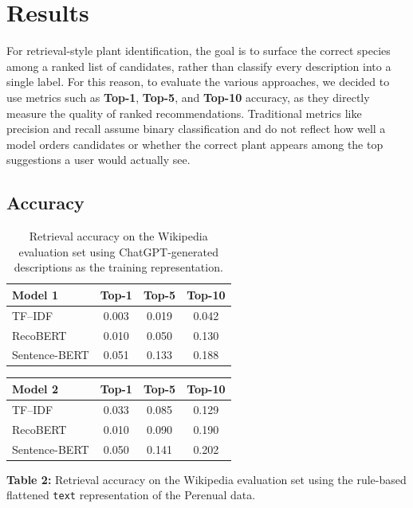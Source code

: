 \documentclass[11pt]{article}
\begin{document}
\section{Results}
For retrieval-style plant identification, the goal is to surface the correct species among a ranked list of candidates, rather than classify every description into a single label. For this reason, to evaluate the various approaches, we decided to use metrics such as \textbf{Top-1}, \textbf{Top-5}, and \textbf{Top-10} accuracy, as they directly measure the quality of ranked recommendations. Traditional metrics like precision and recall assume binary classification and do not reflect how well a model orders candidates or whether the correct plant appears among the top suggestions a user would actually see.

\subsection{Accuracy}
\begin{table}[!h]
\centering
\begin{tabular}{lccc}
\hline
\textbf{Model 1} & \textbf{Top-1} & \textbf{Top-5} & \textbf{Top-10} \\
\hline
TF--IDF         & 0.003 & 0.019 & 0.042 \\
RecoBERT        & 0.010 & 0.050 & 0.130 \\
Sentence-BERT   & 0.051 & 0.133 & 0.188 \\
\hline
\end{tabular}
\caption{Retrieval accuracy on the Wikipedia evaluation set using
ChatGPT-generated descriptions as the training representation.}
\label{tab:results-llm}
\end{table}

\bigskip
\noindent\begin{center}
\begin{tabular}{lccc}
\hline
\textbf{Model 2} & \textbf{Top-1} & \textbf{Top-5} & \textbf{Top-10} \\
\hline
TF--IDF         & 0.033 & 0.085 & 0.129 \\
RecoBERT        & 0.010 & 0.090 & 0.190 \\
Sentence-BERT   & 0.050 & 0.141 & 0.202 \\
\hline
\end{tabular}
\end{center}

\noindent\textbf{Table 2:} Retrieval accuracy on the Wikipedia evaluation set using the
rule-based flattened \texttt{text} representation of the Perenual data.
\end{document}
